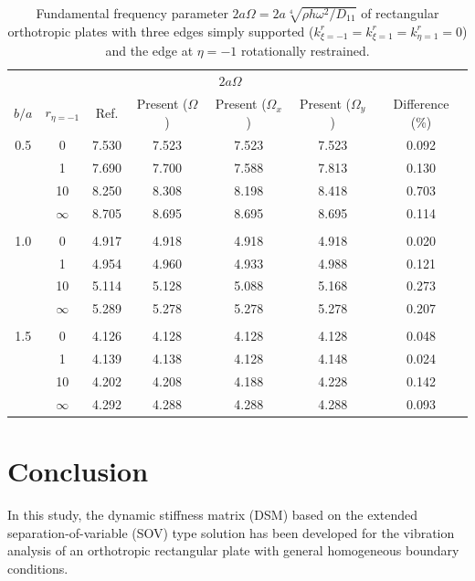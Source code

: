 \documentclass[preprint,12pt]{elsarticle}
\begin{document}
\begin{table}[!htbp]  
	\centering
	\caption{Fundamental frequency parameter \(2a\Omega = 2a\sqrt[4]{\rho h \omega^2/D_{11}}\) of rectangular orthotropic plates with three edges simply supported (\(k^r_{\xi=-1} = k^r_{\xi=1} = k^r_{\eta=1} = 0\)) and the edge at \(\eta = -1\) rotationally restrained.}
	\begin{tabular}{c c c c c c c }
		\toprule
		\multicolumn{2}{c}{} & \multicolumn{4}{c}{$2a\Omega$} & \\ 
		\cmidrule(lr){3-7}
		$b/a$ & $r_{\eta=-1}$ & Ref.\Citealp{zhang2019new} & Present ($\Omega$) & Present ($\Omega_x$) & Present ($\Omega_y$) & Difference (\%) \\ 
		\midrule
		0.5 & 0         & 7.530 & 7.523 & 7.523 & 7.523 & 0.092 \\ 
		& 1         & 7.690 & 7.700 & 7.588 & 7.813 & 0.130 \\ 
		& 10        & 8.250 & 8.308 & 8.198 & 8.418 & 0.703 \\ 
		& $\infty$  & 8.705 & 8.695 & 8.695 & 8.695 & 0.114 \\ 
		\\
		1.0 & 0         & 4.917 & 4.918 & 4.918 & 4.918 & 0.020 \\ 
		& 1         & 4.954 & 4.960 & 4.933 & 4.988 & 0.121 \\ 
		& 10        & 5.114 & 5.128 & 5.088 & 5.168 & 0.273 \\ 
		& $\infty$  & 5.289 & 5.278 & 5.278 & 5.278 & 0.207 \\ 
		\\
		1.5 & 0         & 4.126 & 4.128 & 4.128 & 4.128 & 0.048 \\ 
		& 1         & 4.139 & 4.138 & 4.128 & 4.148 & 0.024 \\ 
		& 10        & 4.202 & 4.208 & 4.188 & 4.228 & 0.142 \\ 
		& $\infty$  & 4.292 & 4.288 & 4.288 & 4.288 & 0.093 \\ 
		\bottomrule
	\end{tabular}
	\label{tab:oth2}
\end{table}

\FloatBarrier
\section{Conclusion}
In this study, the dynamic stiffness matrix (DSM) based on the extended separation-of-variable (SOV) type solution has been developed for the vibration analysis of an orthotropic rectangular plate with general homogeneous boundary conditions. 
\end{document}
